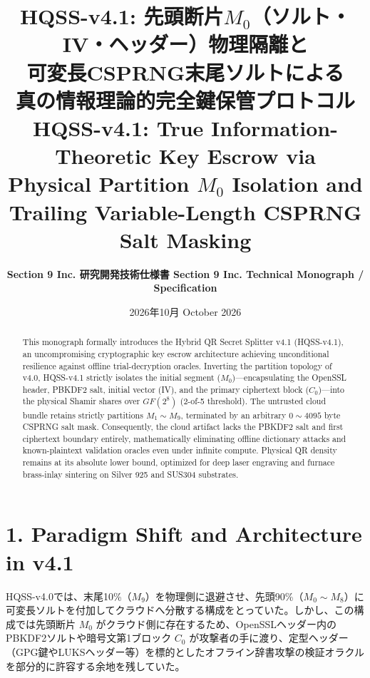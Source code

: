 \documentclass[11pt,a4paper,titlepage]{article}
\title{%
  \LARGE\textbf{%
    \ifja
      HQSS-v4.1: 先頭断片$M_0$（ソルト・IV・ヘッダー）物理隔離と\\可変長CSPRNG末尾ソルトによる\\真の情報理論的完全鍵保管プロトコル
    \else
      HQSS-v4.1: True Information-Theoretic Key Escrow via\\Physical Partition $M_0$ Isolation and Trailing Variable-Length CSPRNG Salt Masking
    \fi
  }
}
\author{%
  \textbf{%
    \ifja Section 9 Inc. 研究開発技術仕様書 \else Section 9 Inc. Technical Monograph / Specification \fi
  }
}
\date{%
  \ifja 2026年10月 \else October 2026 \fi
}
\newif\ifja
\begin{document}
\maketitle

\begin{abstract}
\ifja
本モノグラフでは、暗号鍵（LUKSマスターキーやGnuPG秘密鍵等）の恒久的保管プロトコル「Hybrid QR Secret Splitter v4.1 (HQSS-v4.1)」を提示する。本バージョンでは、v4.0における末尾ブロック（$M_9$）退避設計を根本から反転させ、OpenSSLの\texttt{Salted\_\_}マジック、PBKDF2暗号学的ソルト（64ビット）、初期化ベクトル（IV）、および先頭暗号ブロック（$C_0$）を内包する「先頭断片 $M_0$」を手元物理プレート（Shamir秘密分散 2-of-5）側へ完全に隔離退避させる。パブリッククラウド側には中間から末尾にかけての断片群（$M_1 \sim M_9$）のみを配置し、その末尾に $0 \sim 4095$ バイトのCSPRNG可変長ランダムソルトを単一付加する。本アーキテクチャにより、クラウド単体データからは暗号学的ソルトとIVが完全に消滅し、平文ヘッダー（GPG/LUKS等）を用いた既知平文攻撃オラクルおよびオフライン辞書攻撃が数学的・物理的に完全遮断される。さらに、物理QRコード側のデータ量は極小サイズに維持され、金属板（シルバー925やSUS304真鍮象嵌）へのレーザー彫刻耐性と光学読取マージンを最大限に担保する。
\else
This monograph formally introduces the Hybrid QR Secret Splitter v4.1 (HQSS-v4.1), an uncompromising cryptographic key escrow architecture achieving unconditional resilience against offline trial-decryption oracles. Inverting the partition topology of v4.0, HQSS-v4.1 strictly isolates the initial segment ($M_0$)—encapsulating the OpenSSL header, PBKDF2 salt, initial vector (IV), and the primary ciphertext block ($C_0$)—into the physical Shamir shares over $GF(2^8)$ (2-of-5 threshold). The untrusted cloud bundle retains strictly partitions $M_1 \sim M_9$, terminated by an arbitrary $0 \sim 4095$ byte CSPRNG salt mask. Consequently, the cloud artifact lacks the PBKDF2 salt and first ciphertext boundary entirely, mathematically eliminating offline dictionary attacks and known-plaintext validation oracles even under infinite compute. Physical QR density remains at its absolute lower bound, optimized for deep laser engraving and furnace brass-inlay sintering on Silver 925 and SUS304 substrates.
\fi
\end{abstract}

\vspace{1.5em}

\section{%
  \ifja 1. 設計思想とv4.1におけるパラダイムシフト \else 1. Paradigm Shift and Architecture in v4.1 \fi
}
\ifja
HQSS-v4.0では、末尾10\%（$M_9$）を物理側に退避させ、先頭90\%（$M_0 \sim M_8$）に可変長ソルトを付加してクラウドへ分散する構成をとっていた。しかし、この構成では先頭断片 $M_0$ がクラウド側に存在するため、OpenSSLヘッダー内のPBKDF2ソルトや暗号文第1ブロック $C_0$ が攻撃者の手に渡り、定型ヘッダー（GPG鍵やLUKSヘッダー等）を標的としたオフライン辞書攻撃の検証オラクルを部分的に許容する余地を残していた。
\end{document}
